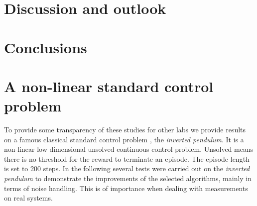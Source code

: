 \documentclass[
 reprint,
 amsmath,amssymb,amsfonts,clevref,
 aps,
prstab,
]{revtex4-2}
\begin{document}
\section{Discussion and outlook}

\section{Conclusions}


\appendix
\section{A non-linear standard control problem}
To provide some transparency of these studies for other labs we provide results on a famous classical standard control problem \cite{Furutaa}, the \emph{inverted pendulum}. It is a non-linear low dimensional unsolved continuous control problem. Unsolved means there is no threshold for the reward to terminate an episode. The episode length is set to 200 steps. In the following several tests were carried out on the \emph{inverted pendulum} to demonstrate the improvements of the selected algorithms, mainly in terms of noise handling. This is of importance when dealing with measurements on real systems.
\end{document}
